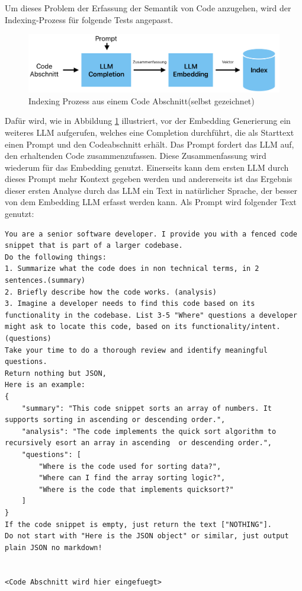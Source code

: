 \documentclass[../main.tex]{subfiles}
\begin{document}
Um dieses Problem der Erfassung der Semantik von Code anzugehen, wird der Indexing-Prozess für folgende Tests angepasst.

\begin{figure}[H]
    \centering
    \includegraphics[scale=.6]{"bilder/prozess.png"}
    \caption{Indexing Prozess aus einem Code Abschnitt(selbst gezeichnet)}
    \label{fig:indexing}
\end{figure}
Dafür wird, wie in Abbildung \ref{fig:indexing} illustriert, vor der Embedding Generierung ein weiteres \gls{LLM} aufgerufen, welches eine Completion durchführt, die als Starttext einen Prompt und den Codeabschnitt erhält.
Das Prompt fordert das \gls{LLM} auf, den erhaltenden Code zusammenzufassen. Diese Zusammenfassung wird wiederum für das Embedding genutzt.
Einerseits kann dem ersten \gls{LLM} durch dieses Prompt mehr Kontext gegeben werden und andererseits ist das Ergebnis dieser ersten Analyse durch das \gls{LLM} ein Text in natürlicher Sprache, der besser von dem Embedding \gls{LLM} erfasst werden kann.
Als Prompt wird folgender Text genutzt:

\begin{lstlisting}
You are a senior software developer. I provide you with a fenced code snippet that is part of a larger codebase.
Do the following things:
1. Summarize what the code does in non technical terms, in 2 sentences.(summary)
2. Briefly describe how the code works. (analysis)
3. Imagine a developer needs to find this code based on its functionality in the codebase. List 3-5 "Where" questions a developer might ask to locate this code, based on its functionality/intent. (questions)
Take your time to do a thorough review and identify meaningful questions.
Return nothing but JSON,
Here is an example:
{
    "summary": "This code snippet sorts an array of numbers. It supports sorting in ascending or descending order.", 
    "analysis": "The code implements the quick sort algorithm to recursively esort an array in ascending  or descending order.",
    "questions": [
        "Where is the code used for sorting data?",
        "Where can I find the array sorting logic?",
        "Where is the code that implements quicksort?"
    ]
}
If the code snippet is empty, just return the text ["NOTHING"].
Do not start with "Here is the JSON object" or similar, just output plain JSON no markdown!


<Code Abschnitt wird hier eingefuegt>
\end{lstlisting}
\end{document}
